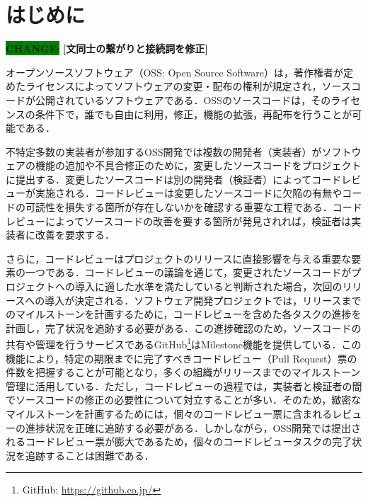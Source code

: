 \documentclass[11pt]{jreport}
\newcommand{\change}[1]{\colorbox{green}{{\bf CHANGE}:}{\color{blue} {\textbf{[#1]}}}}
\begin{document}
\tableofcontents



\newpage
{}	%



\chapter{はじめに}\label{chap:intro}

\change{文同士の繋がりと接続詞を修正}

オープンソースソフトウェア（OSS: Open Source Software）は，著作権者が定めたライセンスによってソフトウェアの変更・配布の権利が規定され，ソースコードが公開されているソフトウェアである．OSSのソースコードは，そのライセンスの条件下で，誰でも自由に利用，修正，機能の拡張，再配布を行うことが可能である\cite{oss}．

不特定多数の実装者が参加するOSS開発では複数の開発者（実装者）がソフトウェアの機能の追加や不具合修正のために，変更したソースコードをプロジェクトに提出する．変更したソースコードは別の開発者（検証者）によってコードレビューが実施される．コードレビューは変更したソースコードに欠陥の有無やコードの可読性を損失する箇所が存在しないかを確認する重要な工程である\cite{quality1}\cite{quality2}．コードレビューによってソースコードの改善を要する箇所が発見されれば，検証者は実装者に改善を要求する． 

さらに，コードレビューはプロジェクトのリリースに直接影響を与える重要な要素の一つである．コードレビューの議論を通じて，変更されたソースコードがプロジェクトへの導入に適した水準を満たしていると判断された場合，次回のリリースへの導入が決定される．ソフトウェア開発プロジェクトでは，リリースまでのマイルストーンを計画するために，コードレビューを含めた各タスクの進捗を計画し，完了状況を追跡する必要がある\cite{review_time}．この進捗確認のため，ソースコードの共有や管理を行うサービスであるGitHub\footnote{GitHub: \url{https://github.co.jp/}}はMilestone機能を提供している．この機能により，特定の期限までに完了すべきコードレビュー（Pull Request）票の件数を把握することが可能となり，多くの組織がリリースまでのマイルストーン管理に活用している．ただし，コードレビューの過程では，実装者と検証者の間でソースコードの修正の必要性について対立することが多い\cite{review_time1}\cite{review_time2}．そのため，緻密なマイルストーンを計画するためには，個々のコードレビュー票に含まれるレビューの進捗状況を正確に追跡する必要がある．しかしながら，OSS開発では提出されるコードレビュー票が膨大であるため，個々のコードレビュータスクの完了状況を追跡することは困難である．
\end{document}
